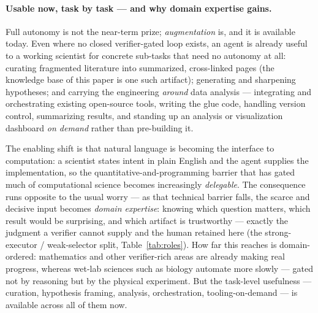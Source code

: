 \documentclass[11pt]{article}
\begin{document}
\paragraph{Usable now, task by task --- and why domain expertise gains.}
Full autonomy is not the near-term prize; \emph{augmentation} is, and it is available today. Even
where no closed verifier-gated loop exists, an agent is already useful to a working scientist for
concrete sub-tasks that need no autonomy at all: curating fragmented literature into summarized,
cross-linked pages (the knowledge base of this paper is one such artifact); generating and
sharpening hypotheses; and carrying the engineering \emph{around} data analysis --- integrating
and orchestrating existing open-source tools, writing the glue code, handling version control,
summarizing results, and standing up an analysis or visualization dashboard \emph{on demand}
rather than pre-building it.

The enabling shift is that natural language is becoming the interface
to computation: a scientist states intent in plain English and the agent supplies the
implementation, so the quantitative-and-programming barrier that has gated much of computational
science becomes increasingly \emph{delegable}. The consequence runs opposite to the usual worry ---
as that technical barrier falls, the scarce and decisive input becomes \emph{domain expertise}:
knowing which question matters, which result would be surprising, and which artifact is
trustworthy --- exactly the judgment a verifier cannot supply and the human retained here (the
strong-executor / weak-selector split, Table~\ref{tab:roles}). How far this reaches is
domain-ordered: mathematics and other verifier-rich areas are already making real progress,
whereas wet-lab sciences such as biology automate more slowly --- gated not by reasoning but by
the physical experiment. But the task-level usefulness --- curation, hypothesis framing, analysis,
orchestration, tooling-on-demand --- is available across all of them now.
\end{document}
